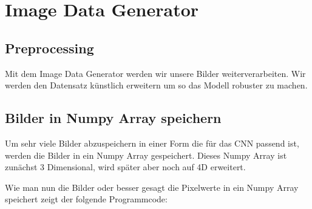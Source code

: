 \documentclass[letterpaper,10pt,english]{jupyterBook}
\begin{document}
\chapter{Image Data Generator}
\label{\detokenize{01_Bilderdatenbank/imagedatagen:image-data-generator}}\label{\detokenize{01_Bilderdatenbank/imagedatagen::doc}}

\section{Preprocessing}
\label{\detokenize{01_Bilderdatenbank/imagedatagen:preprocessing}}
\sphinxAtStartPar
Mit dem Image Data Generator werden wir unsere Bilder weiterverarbeiten. Wir werden den Datensatz künstlich erweitern um so das Modell robuster zu machen.


\section{Bilder in Numpy Array speichern}
\label{\detokenize{01_Bilderdatenbank/imagedatagen:bilder-in-numpy-array-speichern}}
\sphinxAtStartPar
Um sehr viele Bilder abzuspeichern in einer Form die für das CNN passend ist, werden die Bilder in ein Numpy Array gespeichert. Dieses Numpy Array ist zunächst 3 Dimensional, wird später aber noch auf 4D erweitert.

\sphinxAtStartPar
Wie man nun die Bilder oder besser gesagt die Pixelwerte in ein Numpy Array speichert zeigt der folgende Programmcode:

\begin{sphinxVerbatim}[commandchars=\\\{\}]
 

   

   

  

  \PYG{p}{[}    \PYG{p}{]}

\end{sphinxVerbatim}
\end{document}
